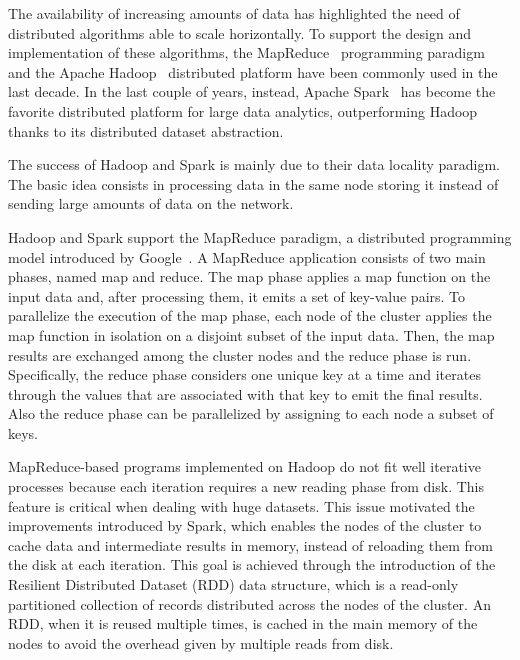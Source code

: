 The availability of increasing amounts of data has highlighted the need of distributed algorithms able to scale horizontally.
To support the design and implementation of these algorithms, the MapReduce~\cite{ArticoloMapReduceGoogle} programming paradigm 
and the Apache Hadoop~\cite{HDFS} distributed platform have been commonly used in the last decade. 
In the last couple of years, instead, Apache Spark~\cite{Zaharia_spark}
has become the favorite distributed platform for large data analytics,
outperforming Hadoop thanks to its distributed dataset abstraction. 

The success of Hadoop and Spark is mainly due to their data locality paradigm. The basic idea consists in processing data in the same node storing it instead of sending large amounts of data on the network.

Hadoop and Spark support the MapReduce paradigm, a distributed programming model introduced by
Google~\cite{ArticoloMapReduceGoogle}.
A MapReduce application consists of two main phases,
named map and reduce. The map phase applies a map function on the input data and, after processing them, it emits a set of key-value pairs. 
To parallelize the execution of the map phase, each node of the cluster applies the map function in isolation on a disjoint subset of the input data. 
Then, the map results are exchanged among the cluster nodes and the reduce phase is run.
Specifically, the reduce phase considers one unique key at a time and iterates
through the values that are associated with that key to emit the final results. Also the reduce phase can be parallelized by assigning to each node a subset of keys.

MapReduce-based programs implemented on Hadoop do not fit well iterative processes because 
each iteration requires a new reading phase from disk.
This feature is critical when dealing with huge datasets.
This issue motivated the improvements introduced by Spark, 
which enables the nodes of the cluster to cache data and intermediate results
in memory, instead of reloading them from the disk at each iteration. This goal is achieved through
the introduction of the Resilient Distributed Dataset (RDD) data structure, which is a read-only
partitioned collection of records distributed across the nodes of the cluster. An RDD, when it is reused multiple times,
is cached in the main memory of the nodes to avoid the overhead given by multiple reads from disk.

